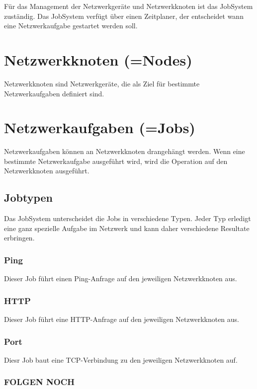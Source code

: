 \documentclass[11pt,a4paper]{report}
\begin{document}
Für das Management der Netzwerkgeräte und Netzwerkknoten ist das JobSystem zuständig. Das JobSystem verfügt über einen Zeitplaner, der entscheidet wann eine Netzwerkaufgabe gestartet werden soll.

\section{Netzwerkknoten (=Nodes)}

Netzwerkknoten sind Netzwerkgeräte, die als Ziel für bestimmte Netzwerkaufgaben definiert sind.

\section{Netzwerkaufgaben (=Jobs)}

Netzwerkaufgaben können an Netzwerkknoten drangehängt werden. Wenn eine bestimmte Netzwerkaufgabe ausgeführt wird, wird die Operation auf den Netzwerkknoten ausgeführt.

\subsection{Jobtypen}

Das JobSystem unterscheidet die Jobs in verschiedene Typen. Jeder Typ erledigt eine ganz spezielle Aufgabe im Netzwerk und kann daher verschiedene Resultate erbringen.

\subsubsection{Ping} Dieser Job führt einen Ping-Anfrage auf den jeweiligen Netzwerkknoten aus.

\subsubsection{HTTP} Dieser Job führt eine HTTP-Anfrage auf den jeweiligen Netzwerkknoten aus.

\subsubsection{Port} Diesr Job baut eine TCP-Verbindung zu den jeweiligen Netzwerkknoten auf.

\subsubsection{FOLGEN NOCH}
\end{document}
